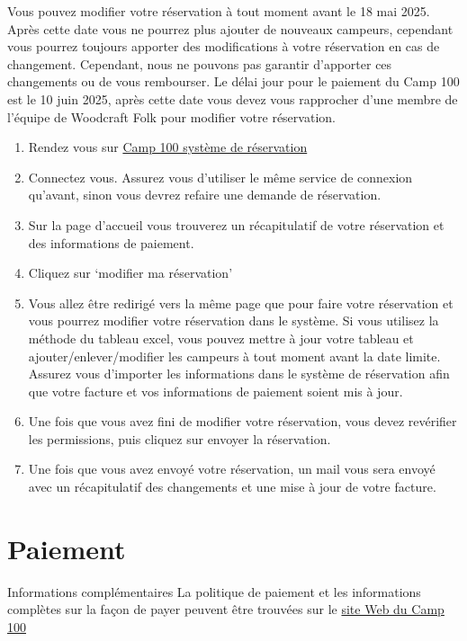 \documentclass[a4paper, 11pt]{report}
\begin{document}
Vous pouvez modifier votre r\'eservation \`a tout moment avant le 18 mai 2025. Apr\`es cette date vous ne pourrez plus ajouter de nouveaux campeurs, cependant vous pourrez toujours apporter des modifications \`a votre r\'eservation en cas de changement. Cependant, nous ne pouvons pas garantir d'apporter ces changements ou de vous rembourser. Le d\'elai jour pour le paiement du Camp 100 est le 10 juin 2025, apr\`es cette date vous devez vous rapprocher d'une membre de l'\'equipe de Woodcraft Folk pour modifier votre r\'eservation.
\begin{enumerate}
    \item Rendez vous sur \href{https://bookings.camp100.org.uk}{Camp 100 syst\`eme de r\'eservation}
    \item Connectez vous. Assurez vous d'utiliser le m\^eme service de connexion qu'avant, sinon vous devrez refaire une demande de r\'eservation. 
    \item Sur la page d'accueil vous trouverez un r\'ecapitulatif de votre r\'eservation et des informations de paiement.
    \item Cliquez sur `modifier ma r\'eservation'
    \item Vous allez \^etre redirig\'e vers la m\^eme page que pour faire votre r\'eservation et vous pourrez modifier votre r\'eservation dans le syst\`eme. Si vous utilisez la m\'ethode du tableau excel, vous pouvez mettre \`a jour votre tableau et ajouter/enlever/modifier les campeurs \`a tout moment avant la date limite. Assurez vous d'importer les informations dans le syst\`eme de r\'eservation afin que votre facture et vos informations de paiement soient mis \`a jour.
    \item Une fois que vous avez fini de modifier votre r\'eservation, vous devez rev\'erifier les permissions, puis cliquez sur envoyer la r\'eservation.
    \item Une fois que vous avez envoy\'e votre r\'eservation, un mail vous sera envoy\'e avec un r\'ecapitulatif des changements et une mise \`a jour de votre facture.
\end{enumerate}

\chapter{Paiement}
\label{chap:payment}

\begin{callout-orange}{Informations compl\'ementaires}
La politique de paiement et les informations compl\`etes sur la façon de payer peuvent \^etre trouv\'ees sur le \href{https://camp100.org.uk}{site Web du Camp 100}
\end{callout-orange}
\end{document}

